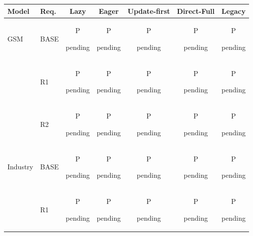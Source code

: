 \begingroup\scriptsize\setlength{\tabcolsep}{3pt}
\begin{tabular}{@{}llccccc@{}}
\toprule
Model & Req. & Lazy & Eager & Update-first & Direct-Full & Legacy\\
\midrule
GSM & BASE & \shortstack[c]{\strut P\\[-3pt]\strut pending} & \shortstack[c]{\strut P\\[-3pt]\strut pending} & \shortstack[c]{\strut P\\[-3pt]\strut pending} & \shortstack[c]{\strut P\\[-3pt]\strut pending} & \shortstack[c]{\strut P\\[-3pt]\strut pending}\\
 & R1 & \shortstack[c]{\strut P\\[-3pt]\strut pending} & \shortstack[c]{\strut P\\[-3pt]\strut pending} & \shortstack[c]{\strut P\\[-3pt]\strut pending} & \shortstack[c]{\strut P\\[-3pt]\strut pending} & \shortstack[c]{\strut P\\[-3pt]\strut pending}\\
 & R2 & \shortstack[c]{\strut P\\[-3pt]\strut pending} & \shortstack[c]{\strut P\\[-3pt]\strut pending} & \shortstack[c]{\strut P\\[-3pt]\strut pending} & \shortstack[c]{\strut P\\[-3pt]\strut pending} & \shortstack[c]{\strut P\\[-3pt]\strut pending}\\
\addlinespace[2pt]
Industry & BASE & \shortstack[c]{\strut P\\[-3pt]\strut pending} & \shortstack[c]{\strut P\\[-3pt]\strut pending} & \shortstack[c]{\strut P\\[-3pt]\strut pending} & \shortstack[c]{\strut P\\[-3pt]\strut pending} & \shortstack[c]{\strut P\\[-3pt]\strut pending}\\
 & R1 & \shortstack[c]{\strut P\\[-3pt]\strut pending} & \shortstack[c]{\strut P\\[-3pt]\strut pending} & \shortstack[c]{\strut P\\[-3pt]\strut pending} & \shortstack[c]{\strut P\\[-3pt]\strut pending} & \shortstack[c]{\strut P\\[-3pt]\strut pending}\\

\end{tabular}
